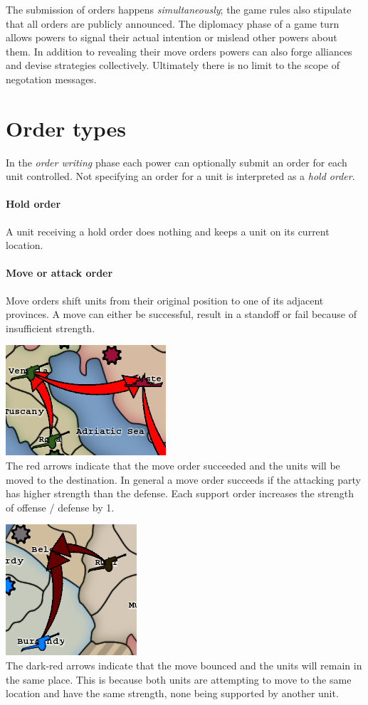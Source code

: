 \documentclass[pdftex,12pt,a4paper]{report}
\begin{document}
The submission of orders happens \textit{simultaneously}; the game
rules also stipulate that all orders are publicly announced. The diplomacy
phase of a game turn allows powers to signal their actual intention or
mislead other powers about them. In addition to revealing their move
orders powers can also forge alliances and devise strategies
collectively. Ultimately there is no limit to the scope of negotation
messages.

\section{Order types}

In the \textit{order writing} phase each power can optionally submit
an order for each unit controlled. Not specifying an order for a 
unit is interpreted as a \textit{hold order}. 

\paragraph{Hold order}
A unit receiving a hold order does nothing and keeps a unit on its 
current location. 

\paragraph{Move or attack order} 
Move orders shift units from their original position to one of its
adjacent provinces. A move can either be successful, result in a
standoff or fail because of insufficient strength. 

\includegraphics{./screenshots/Move0.png} \\[1cm]
The red arrows indicate that the move order succeeded and the units
will be moved to the destination. In general a move order succeeds
if the attacking party has higher strength than the defense. Each 
support order increases the strength of offense / defense by 1.


\includegraphics{./screenshots/BouncedMove.png} \\[1cm]
The dark-red arrows indicate that the move bounced and the units will
remain in the same place. This is because both units are attempting 
to move to the same location and have the same strength, none being
supported by another unit.
\end{document}

